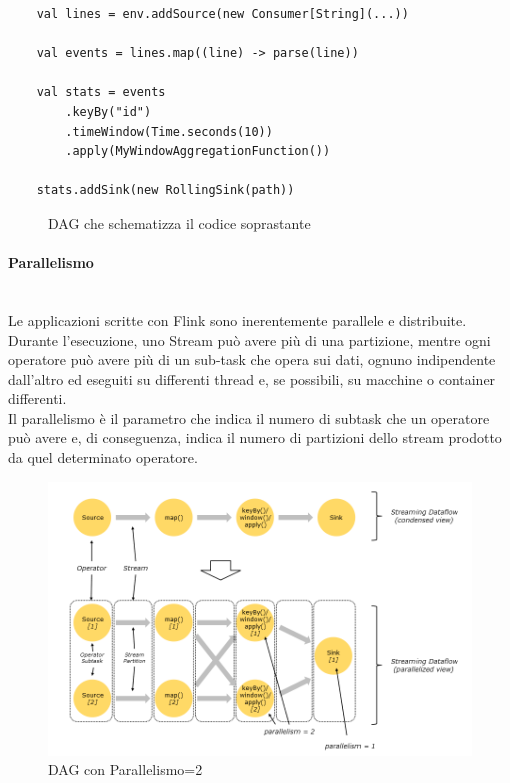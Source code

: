 \pagebreak

\begin{verbatim}
    val lines = env.addSource(new Consumer[String](...))
	
    val events = lines.map((line) -> parse(line))
	
    val stats = events
        .keyBy("id")
        .timeWindow(Time.seconds(10))
        .apply(MyWindowAggregationFunction())
		
    stats.addSink(new RollingSink(path))
\end{verbatim}

\begin{figure}[th]
	\centering
	\def\svgwidth{\columnwidth}
	
	\decoRule
	\caption[Streaming Dataflow]{DAG che schematizza il codice soprastante}
	\label{fig:Dataflow}
\end{figure}

\pagebreak

\paragraph{Parallelismo} \label{ParallelismFlink} ~\\

Le applicazioni scritte con Flink sono inerentemente parallele e distribuite. Durante l'esecuzione, uno Stream può avere più di una partizione, mentre ogni operatore può avere più di un sub-task che opera sui dati, ognuno indipendente dall'altro ed eseguiti su differenti thread e, se possibili, su macchine o container differenti.\\
Il parallelismo è il parametro che indica il numero di subtask che un operatore può avere e, di conseguenza, indica il numero di partizioni dello stream prodotto da quel determinato operatore.\\

\begin{figure}
    \centering
    \includegraphics{Figures/parallel_dataflow.png}
    \decoRule
    \caption[Parallel Dataflow]{DAG con Parallelismo=2}
    \label{fig:ParallelDataflow}
\end{figure}

